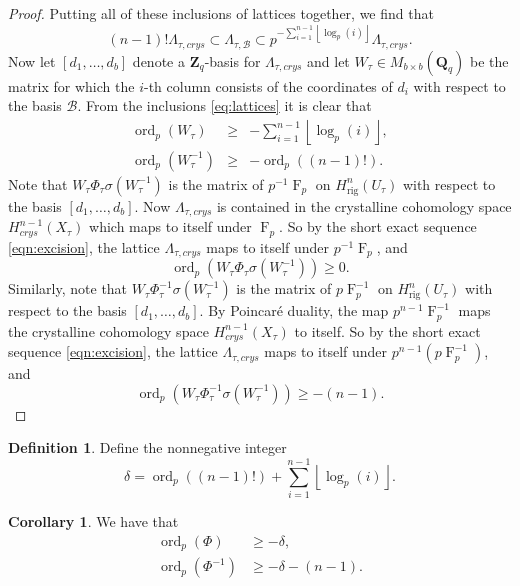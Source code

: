 \documentclass[a4paper,11pt]{article}
\numberwithin{equation}{section}
\providecommand{\floor}[1]{\left\lfloor#1\right\rfloor}   %
\newcommand{\ZZ}{\mathbf{Z}} %
\newcommand{\QQ}{\mathbf{Q}} %
\DeclareMathOperator{\ord}{ord}          %
\DeclareMathOperator{\Frob}{F}           %
\providecommand{\Hrig}{H_{\text{rig}}}  %
\providecommand{\cB}{\mathcal{B}} %
\theoremstyle{definition}
\newtheorem{cor}[thm]{Corollary}
\newtheorem{defn}[thm]{Definition}
\begin{document}
\begin{proof}
Putting all of these inclusions of lattices together, we find that
\begin{equation} \label{eq:lattices}
(n-1)! \Lambda_{\tau,crys} \subset \Lambda_{\tau,\cB} \subset p^{-\sum_{i=1}^{n-1} \floor{\log_p(i)}} \Lambda_{\tau,crys}.
\end{equation}
Now let $[d_1, \ldots, d_b]$ denote a $\ZZ_q$-basis for $\Lambda_{\tau,crys}$ and let $W_{\tau} \in M_{b \times b}(\QQ_q)$ be the matrix
for which the $i$-th column consists of the coordinates of $d_i$ with respect to the basis $\cB$. From the inclusions \eqref{eq:lattices}
it is clear that 
\begin{eqnarray*}
\ord_p(W_{\tau}) &\geq& -\sum_{i=1}^{n-1} \floor{\log_p(i)}, \\
\ord_p(W_{\tau}^{-1}) &\geq& -\ord_p((n-1)!).
\end{eqnarray*}
Note that $W_{\tau} \Phi_{\tau} \sigma(W_{\tau}^{-1})$ is the matrix of $p^{-1}\Frob_{p}$ on $\Hrig^n(U_{\tau})$
with respect to the basis $[d_1,\ldots,d_b]$. Now $\Lambda_{\tau,crys}$ is contained in the crystalline cohomology 
space $H^{n-1}_{crys}(X_{\tau})$ which maps to itself under $\Frob_p$. So by the short exact sequence 
\eqref{eqn:excision}, the lattice $\Lambda_{\tau,crys}$ maps to itself under $p^{-1}\Frob_{p}$, and
\[
\ord_p(W_{\tau} \Phi_{\tau} \sigma(W_{\tau}^{-1})) \geq 0.
\]
Similarly, note that $W_{\tau} \Phi_{\tau}^{-1} \sigma(W_{\tau}^{-1})$ is the matrix of $p\Frob_p^{-1}$ on 
$\Hrig^n(U_{\tau})$ with respect to the basis $[d_1,\ldots,d_b]$. By Poincar\'e duality, 
the map $p^{n-1}\Frob_p^{-1}$ maps the crystalline cohomology space $H^{n-1}_{crys}(X_{\tau})$
to itself. So by the short exact sequence \eqref{eqn:excision}, the lattice $\Lambda_{\tau,crys}$ 
maps to itself under $p^{n-1} (p\Frob_p^{-1})$, and 
\[
\ord_p(W_{\tau} \Phi_{\tau}^{-1} \sigma(W_{\tau}^{-1})) \geq -(n-1).
\]
\end{proof}

\begin{defn} \label{defn:delta}
Define the nonnegative integer
\[
\delta = \ord_p((n-1)!)+\sum_{i=1}^{n-1} \floor{\log_p(i)}.
\]
\end{defn}

\begin{cor} \label{cor:delta} We have that
\begin{align*}
\ord_p(\Phi) &\geq -\delta, \\
\ord_p(\Phi^{-1}) &\geq -\delta-(n-1).
\end{align*}
\end{cor}
\end{document}
